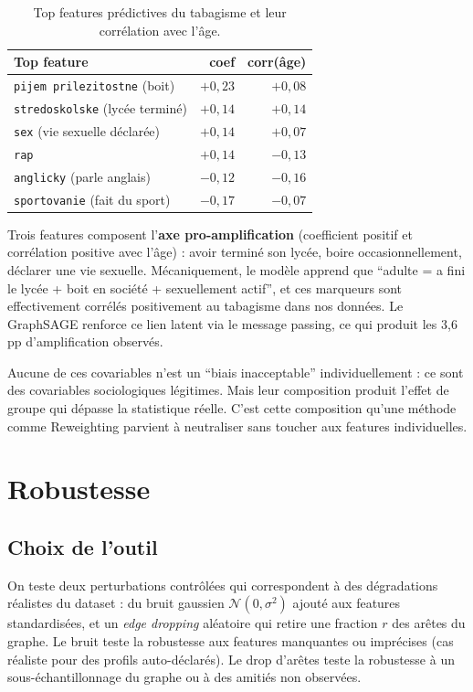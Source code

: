 \documentclass[10pt,a4paper,twocolumn]{article}
\begin{document}
\begin{table}[H]
\centering
\footnotesize
\begin{tabular}{lrr}
\toprule
Top feature & coef & corr(âge) \\
\midrule
\texttt{pijem prilezitostne} (boit) & $+0{,}23$ & $+0{,}08$ \\
\texttt{stredoskolske} (lycée terminé) & $+0{,}14$ & $+0{,}14$ \\
\texttt{sex} (vie sexuelle déclarée) & $+0{,}14$ & $+0{,}07$ \\
\texttt{rap} & $+0{,}14$ & $-0{,}13$ \\
\texttt{anglicky} (parle anglais) & $-0{,}12$ & $-0{,}16$ \\
\texttt{sportovanie} (fait du sport) & $-0{,}17$ & $-0{,}07$ \\
\bottomrule
\end{tabular}
\caption{Top features prédictives du tabagisme et leur corrélation avec l'âge.}
\end{table}

Trois features composent l'\textbf{axe pro-amplification} (coefficient positif et corrélation positive avec l'âge) : avoir terminé son lycée, boire occasionnellement, déclarer une vie sexuelle. Mécaniquement, le modèle apprend que ``adulte = a fini le lycée + boit en société + sexuellement actif'', et ces marqueurs sont effectivement corrélés positivement au tabagisme dans nos données. Le GraphSAGE renforce ce lien latent via le message passing, ce qui produit les 3{,}6\,pp d'amplification observés.

Aucune de ces covariables n'est un ``biais inacceptable'' individuellement : ce sont des covariables sociologiques légitimes. Mais leur composition produit l'effet de groupe qui dépasse la statistique réelle. C'est cette composition qu'une méthode comme Reweighting parvient à neutraliser sans toucher aux features individuelles.

\section{Robustesse}

\subsection{Choix de l'outil}

On teste deux perturbations contrôlées qui correspondent à des dégradations réalistes du dataset : du bruit gaussien $\mathcal{N}(0, \sigma^2)$ ajouté aux features standardisées, et un \emph{edge dropping} aléatoire qui retire une fraction $r$ des arêtes du graphe. Le bruit teste la robustesse aux features manquantes ou imprécises (cas réaliste pour des profils auto-déclarés). Le drop d'arêtes teste la robustesse à un sous-échantillonnage du graphe ou à des amitiés non observées.
\end{document}
